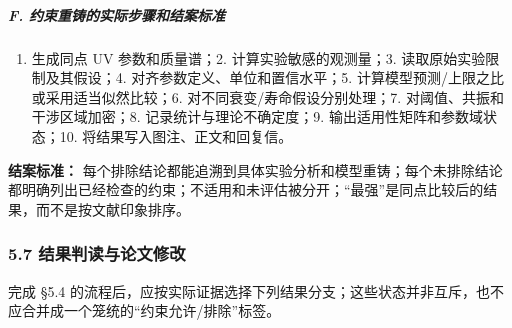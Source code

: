 \documentclass[
  chinese,
  UTF8]{ctexart}
\providecommand{\tightlist}{%
  \setlength{\itemsep}{0pt}\setlength{\parskip}{0pt}}
\begin{document}
\subparagraph{F.
约束重铸的实际步骤和结案标准}\label{f.-ux7ea6ux675fux91cdux94f8ux7684ux5b9eux9645ux6b65ux9aa4ux548cux7ed3ux6848ux6807ux51c6}

\begin{enumerate}
\def\labelenumi{\arabic{enumi}.}
\tightlist
\item
  生成同点 UV 参数和质量谱；2. 计算实验敏感的观测量；3.
  读取原始实验限制及其假设；4. 对齐参数定义、单位和置信水平；5.
  计算模型预测/上限之比或采用适当似然比较；6.
  对不同衰变/寿命假设分别处理；7. 对阈值、共振和干涉区域加密；8.
  记录统计与理论不确定度；9. 输出适用性矩阵和参数域状态；10.
  将结果写入图注、正文和回复信。
\end{enumerate}

\textbf{结案标准：}
每个排除结论都能追溯到具体实验分析和模型重铸；每个未排除结论都明确列出已经检查的约束；不适用和未评估被分开；``最强''是同点比较后的结果，而不是按文献印象排序。

\subsubsection{5.7 结果判读与论文修改}\label{major-4-step-7}

完成 §5.4
的流程后，应按实际证据选择下列结果分支；这些状态并非互斥，也不应合并成一个笼统的``约束允许/排除''标签。
\end{document}
